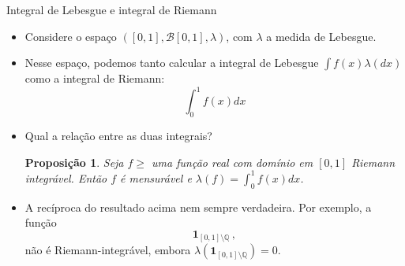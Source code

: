 \documentclass[11pt]{beamer}
\newtheorem{proposition}{Proposição}
\begin{document}
	\begin{frame}{Integral de Lebesgue e integral de Riemann}
		\begin{itemize}
			\item 	 Considere o espaço $([0,1], \mathcal{B}[0,1], \lambda)$, com $\lambda$ a medida de Lebesgue.
			\item Nesse espaço, podemos tanto calcular a integral de Lebesgue $\int f(x)\lambda(dx)$ como a integral de Riemann:
			$$\int_{0} ^1 f(x) dx$$
			\item Qual a relação entre as duas integrais?
			\begin{proposition}
				Seja $f\geq$ uma função real com domínio em $[0,1]$ Riemann integrável. Então $f$ é mensurável e $\lambda(f) = \int_0^1 f(x) dx$.
			\end{proposition}
			\item A recíproca do resultado acima nem sempre verdadeira. Por exemplo, a função
			$$\mathbf{1}_{[0,1]\setminus  \mathbb{Q}}\, ,$$
			não é Riemann-integrável, embora $\lambda(\mathbf{1}_{[0,1]\setminus  \mathbb{Q}}) = 0$.
		\end{itemize}

	\end{frame}
	
\end{document}
